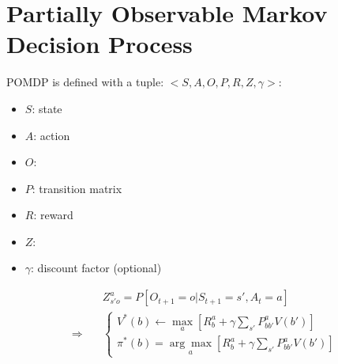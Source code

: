 \section{Partially Observable Markov Decision Process}
\ac{POMDP} is defined with a tuple: $<S, A, O, P, R, Z, \gamma>$:
\begin{itemize}
	\item $S$: state
	\item $A$: action
	\item $O$: 
	\item $P$: transition matrix
	\item $R$: reward
	\item $Z$: 
	\item $\gamma$: discount factor (optional)
\end{itemize}
\begin{align}	
	&Z_{s'o}^a = P \left[ O_{t+1} =o | S_{t+1} = s', A_t = a \right]\\
	\Rightarrow \quad &\begin{cases}
		\displaystyle V^*(b) \leftarrow \underset{a}{\max}\left[ R_b^a + \gamma \sum_{s'} P_{bb'}^a V(b') \right]\\
		\displaystyle \pi^*(b) = \underset{a}{\arg\max} \left[ R_b^a + \gamma \sum_{s'} P_{bb'}^a V(b') \right]
	\end{cases}
\end{align}